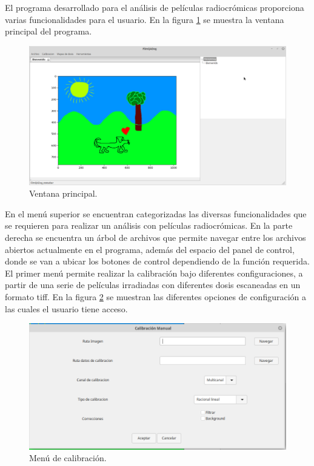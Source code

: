 El programa desarrollado para el análisis de películas radiocrómicas proporciona varias funcionalidades para el usuario. En la figura \ref{fig:ventanaPrincipal} se muestra la ventana principal del programa.\\
\begin{figure}[H]
	\centering
	\includegraphics[width=0.7\linewidth]{images/imagenesDocumentacion/ventanaPrincipal.png}
	\caption{Ventana principal. }
	\label{fig:ventanaPrincipal}
\end{figure}

En el menú superior se encuentran categorizadas las diversas funcionalidades que se requieren para realizar un análisis con películas radiocrómicas. En la parte derecha se encuentra un árbol de archivos que permite navegar entre los archivos abiertos actualmente en el programa, además del espacio del panel de control, donde se van a ubicar los botones de control dependiendo de la función requerida.\\

El primer menú permite realizar la calibración bajo diferentes configuraciones, a partir de una serie de películas irradiadas con diferentes dosis escaneadas en un formato tiff. En la figura \ref{fig:menuCalibracion} se muestran las diferentes opciones de configuración a las cuales el usuario tiene acceso.\\
\begin{figure}[H]
	\centering
	\includegraphics[width=0.7\linewidth]{images/imagenesDocumentacion/menuCalibracion.png}
	\caption{Menú de calibración. }
	\label{fig:menuCalibracion}
\end{figure}

